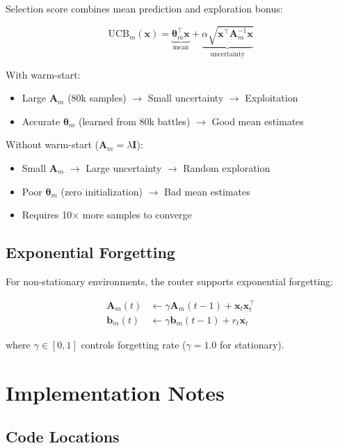 \documentclass[sigconf]{acmart}
\begin{document}
Selection score combines mean prediction and exploration bonus:

\begin{equation}
\text{UCB}_m(\mathbf{x}) = \underbrace{\boldsymbol{\theta}_m^\top \mathbf{x}}_{\text{mean}} + \underbrace{\alpha \sqrt{\mathbf{x}^\top \mathbf{A}_m^{-1} \mathbf{x}}}_{\text{uncertainty}}
\end{equation}

With warm-start:
\begin{itemize}
    \item Large $\mathbf{A}_m$ (80k samples) $\rightarrow$ Small uncertainty $\rightarrow$ Exploitation
    \item Accurate $\boldsymbol{\theta}_m$ (learned from 80k battles) $\rightarrow$ Good mean estimates
\end{itemize}

Without warm-start ($\mathbf{A}_m = \lambda \mathbf{I}$):
\begin{itemize}
    \item Small $\mathbf{A}_m$ $\rightarrow$ Large uncertainty $\rightarrow$ Random exploration
    \item Poor $\boldsymbol{\theta}_m$ (zero initialization) $\rightarrow$ Bad mean estimates
    \item Requires 10$\times$ more samples to converge
\end{itemize}

\subsection{Exponential Forgetting}
\label{sec:forgetting}

For non-stationary environments, the router supports exponential forgetting:

\begin{align}
\mathbf{A}_m(t) &\leftarrow \gamma \mathbf{A}_m(t-1) + \mathbf{x}_t \mathbf{x}_t^\top \\
\mathbf{b}_m(t) &\leftarrow \gamma \mathbf{b}_m(t-1) + r_t \mathbf{x}_t
\end{align}

where $\gamma \in [0, 1]$ controls forgetting rate ($\gamma=1.0$ for stationary).

\section{Implementation Notes}

\subsection{Code Locations}
\end{document}
